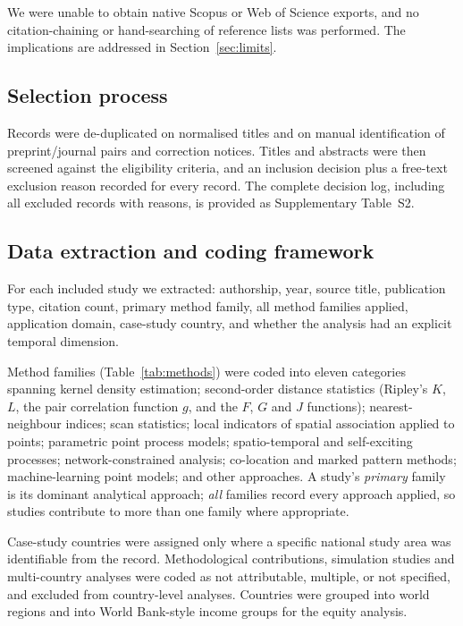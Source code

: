 \documentclass[11pt,a4paper]{article}
\begin{document}
We were unable to obtain native Scopus or Web of Science exports, and no
citation-chaining or hand-searching of reference lists was performed. The
implications are addressed in Section~\ref{sec:limits}.

\subsection{Selection process}
Records were de-duplicated on normalised titles and on manual identification
of preprint/journal pairs and correction notices. Titles and abstracts were
then screened against the eligibility criteria, and an inclusion decision plus
a free-text exclusion reason recorded for every record. The complete decision
log, including all excluded records with reasons, is provided as
Supplementary Table~S2.

\subsection{Data extraction and coding framework}
For each included study we extracted: authorship, year, source title,
publication type, citation count, primary method family, all method families
applied, application domain, case-study country, and whether the analysis had
an explicit temporal dimension.

Method families (Table~\ref{tab:methods}) were coded into eleven categories
spanning kernel density estimation; second-order distance statistics
(Ripley's $K$, $L$, the pair correlation function $g$, and the $F$, $G$ and
$J$ functions); nearest-neighbour indices; scan statistics; local indicators
of spatial association applied to points; parametric point process models;
spatio-temporal and self-exciting processes; network-constrained analysis;
co-location and marked pattern methods; machine-learning point models; and
other approaches. A study's \emph{primary} family is its dominant analytical
approach; \emph{all} families record every approach applied, so studies
contribute to more than one family where appropriate.

Case-study countries were assigned only where a specific national study area
was identifiable from the record. Methodological contributions, simulation
studies and multi-country analyses were coded as not attributable, multiple,
or not specified, and excluded from country-level analyses. Countries were
grouped into world regions and into World Bank-style income groups for the
equity analysis.
\end{document}
